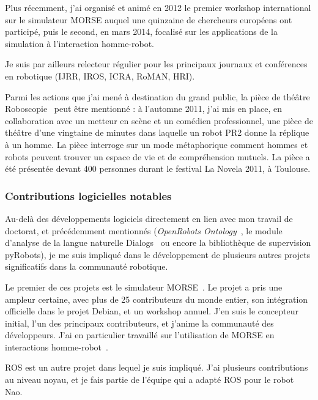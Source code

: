 \documentclass[a4paper]{article}
\begin{document}
Plus récemment, j'ai organisé et animé en 2012 le premier workshop international
sur le simulateur MORSE auquel une quinzaine de chercheurs européens ont
participé, puis le second, en mars 2014, focalisé sur les applications de la
simulation à l'interaction homme-robot.

Je suis par ailleurs relecteur régulier pour les principaux journaux et
conférences en robotique (IJRR, IROS, ICRA, RoMAN, HRI).

Parmi les actions que j'ai mené à destination du grand public, la pièce de
théâtre Roboscopie~\cite{lemaignan2012roboscopie} peut être mentionné : à l'automne
2011, j'ai mis en place, en collaboration avec un metteur en scène et un
comédien professionnel, une pièce de théâtre d'une vingtaine de minutes dans
laquelle un robot PR2 donne la réplique à un homme. La pièce interroge sur un
mode métaphorique comment hommes et robots peuvent trouver un espace de vie et
de compréhension mutuels. La pièce a été présentée devant 400 personnes
durant le festival La Novela 2011, à Toulouse.

\subsubsection*{Contributions logicielles notables}

Au-delà des développements logiciels directement en lien avec mon travail de
doctorat, et précédemment mentionnés (\emph{OpenRobots
Ontology}~\cite{lemaignan2010oro}, le module d'analyse de la langue naturelle
{\sc Dialogs}~\cite{lemaignan2011grounding} ou encore la bibliothèque de
supervision {\sc pyRobots}\cite{lemaignan2015pyrobots}), je me suis impliqué
dans le développement de plusieurs autres projets significatifs dans la
communauté robotique.

Le premier de ces projets est le simulateur MORSE~\cite{echeverria2011modular,
echeverria2012simulating}. Le projet a pris une ampleur certaine, avec plus de
25 contributeurs du monde entier, son intégration officielle dans le projet
Debian, et un workshop annuel. J'en suis le concepteur initial, l'un des
principaux contributeurs, et j'anime la communauté des développeurs. J'ai en
particulier travaillé sur l'utilisation de MORSE en interactions
homme-robot~\cite{lemaignan2012morse,lemaignan2014simulation}.

ROS est un autre projet dans lequel je suis impliqué.  J'ai plusieurs
contributions au niveau noyau, et je fais partie de l'équipe qui a adapté ROS
pour le robot Nao.
\end{document}
